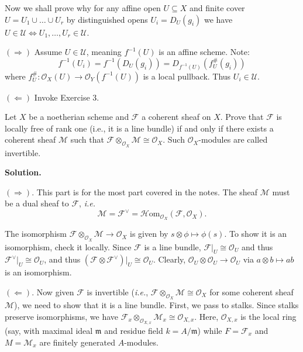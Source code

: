 \documentclass{template}
\begin{document}
Now we shall prove why for any affine open $U \subseteq X$ and finite cover
$U = U_1 \cup \dots \cup U_r$ by distinguished opens $U_i = D_U(g_i)$ we have
$U \in \mathcal{U} \Leftrightarrow U_1,\dots,U_r \in \mathcal{U}$.

$(\Rightarrow)$ Assume $U \in \mathcal{U}$, meaning $f^{-1}(U)$ is an affine scheme. Note:
\begin{equation*}
    f^{-1}(U_i) = f^{-1}(D_U(g_i)) = D_{f^{-1}(U)}(f^{\#}_U(g_i))
\end{equation*}
where $f^{\#}_U: \mathcal{O}_X(U) \to \mathcal{O}_Y(f^{-1}(U))$ is a local pullback. 
Thus $U_i \in \mathcal{U}$.

$(\Leftarrow)$ Invoke Exercise 3.

\begin{problem}[Exercise 5]
    Let $X$ be a noetherian scheme and $\mathcal{F}$ a coherent sheaf on $X$.
    Prove that $\mathcal{F}$ is locally free of rank one (i.e., it is a line bundle)
    if and only if there exists a coherent sheaf $\mathcal{M}$ such that 
    $\mathcal{F} \otimes_{\mathcal{O}_X} \mathcal{M} \cong \mathcal{O}_X$.
    Such $\mathcal{O}_X$-modules are called invertible.
\end{problem}

\textbf{Solution.} 

$(\Rightarrow)$. This part is for the most part covered in the notes. The sheaf
$\mathcal{M}$ must be a dual sheaf to $\mathcal{F}$, \textit{i.e.}
\begin{equation*}
    \mathcal{M} = \mathcal{F}^{\vee} = \text{$\mathcal{H}$om}_{\mathcal{O}_X}(\mathcal{F}, \mathcal{O}_X).
\end{equation*}

The isomorphism $\mathcal{F} \otimes_{\mathcal{O}_X} \mathcal{M} \to
\mathcal{O}_X$ is given by $s \otimes \phi \mapsto \phi(s)$. To show 
it is an isomorphism, check it locally. Since $\mathcal{F}$ is a line bundle,
$\mathcal{F}|_U \cong \mathcal{O}_U$ and thus $\mathcal{F}^{\vee}|_U \cong \mathcal{O}_U$,
and thus $(\mathcal{F} \otimes \mathcal{F}^{\vee})|_{U} \cong \mathcal{O}_U$.
Clearly, $\mathcal{O}_U \otimes \mathcal{O}_U \to \mathcal{O}_U$ via $a \otimes b \mapsto ab$ is an isomorphism.

$(\Leftarrow)$. Now given $\mathcal{F}$ is invertible (\textit{i.e.},
$\mathcal{F} \otimes_{\mathcal{O}_X} \mathcal{M} \cong \mathcal{O}_X$ for some
coherent sheaf $\mathcal{M}$), we need to show that it is a line bundle. First,
we pass to stalks. Since stalks preserve isomorphisms, we have $\mathcal{F}_x
\otimes_{\mathcal{O}_{X,x}} \mathcal{M}_x \cong \mathcal{O}_{X,x}$. Here,
$\mathcal{O}_{X,x}$ is the local ring (say, with maximal ideal $\mathfrak{m}$
and residue field $k = A/\mathfrak{m}$) while $F=\mathcal{F}_x$ and $M=\mathcal{M}_x$
are finitely generated $A$-modules. 
\end{document}
